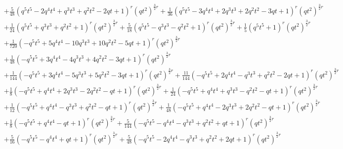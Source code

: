 \documentclass[11pt,english]{amsart}
\numberwithin{equation}{section}
\numberwithin{figure}{section}
\theoremstyle{plain}
\theoremstyle{plain}
\theoremstyle{definition}
\theoremstyle{remark}
\begin{document}
{\begin{align*}
& + \frac{5}{48}  {\left(q^{5} t^{5} - 2  q^{4} t^{4} + q^{3} t^{3} + q^{2} t^{2} - 2  q t + 1\right)}^{r} \left(q t^{2}\right)^{\frac{3}{2}  r} + \frac{1}{36}  {\left(q^{5} t^{5} - 3  q^{4} t^{4} + 2  q^{3} t^{3} + 2  q^{2} t^{2} - 3  q t + 1\right)}^{r} \left(q t^{2}\right)^{\frac{3}{2}  r} \\
& + \frac{1}{24}  {\left(q^{5} t^{5} + q^{3} t^{3} + q^{2} t^{2} + 1\right)}^{r} \left(q t^{2}\right)^{\frac{3}{2}  r} + \frac{5}{18}  {\left(q^{5} t^{5} - q^{3} t^{3} - q^{2} t^{2} + 1\right)}^{r} \left(q t^{2}\right)^{\frac{3}{2}  r} + \frac{1}{5}  {\left(q^{5} t^{5} + 1\right)}^{r} \left(q t^{2}\right)^{\frac{3}{2}  r} \\
& + \frac{1}{720}  {\left(-q^{5} t^{5} + 5  q^{4} t^{4} - 10  q^{3} t^{3} + 10  q^{2} t^{2} - 5  q t + 1\right)}^{r} \left(q t^{2}\right)^{\frac{3}{2}  r} \\
& + \frac{1}{48}  {\left(-q^{5} t^{5} + 3  q^{4} t^{4} - 4  q^{3} t^{3} + 4  q^{2} t^{2} - 3  q t + 1\right)}^{r} \left(q t^{2}\right)^{\frac{3}{2}  r} \\
& + \frac{1}{144}  {\left(-q^{5} t^{5} + 3  q^{4} t^{4} - 5  q^{3} t^{3} + 5  q^{2} t^{2} - 3  q t + 1\right)}^{r} \left(q t^{2}\right)^{\frac{3}{2}  r} + \frac{11}{144}  {\left(-q^{5} t^{5} + 2  q^{4} t^{4} - q^{3} t^{3} + q^{2} t^{2} - 2  q t + 1\right)}^{r} \left(q t^{2}\right)^{\frac{3}{2}  r} \\
& + \frac{1}{8}  {\left(-q^{5} t^{5} + q^{4} t^{4} + 2  q^{3} t^{3} - 2  q^{2} t^{2} - q t + 1\right)}^{r} \left(q t^{2}\right)^{\frac{3}{2}  r} + \frac{1}{24}  {\left(-q^{5} t^{5} + q^{4} t^{4} + q^{3} t^{3} - q^{2} t^{2} - q t + 1\right)}^{r} \left(q t^{2}\right)^{\frac{3}{2}  r} \\
& + \frac{1}{12}  {\left(-q^{5} t^{5} + q^{4} t^{4} - q^{3} t^{3} + q^{2} t^{2} - q t + 1\right)}^{r} \left(q t^{2}\right)^{\frac{3}{2}  r} + \frac{1}{48}  {\left(-q^{5} t^{5} + q^{4} t^{4} - 2  q^{3} t^{3} + 2  q^{2} t^{2} - q t + 1\right)}^{r} \left(q t^{2}\right)^{\frac{3}{2}  r} \\
& + \frac{1}{8}  {\left(-q^{5} t^{5} + q^{4} t^{4} - q t + 1\right)}^{r} \left(q t^{2}\right)^{\frac{3}{2}  r} + \frac{5}{144}  {\left(-q^{5} t^{5} - q^{4} t^{4} - q^{3} t^{3} + q^{2} t^{2} + q t + 1\right)}^{r} \left(q t^{2}\right)^{\frac{3}{2}  r} \\
& + \frac{5}{16}  {\left(-q^{5} t^{5} - q^{4} t^{4} + q t + 1\right)}^{r} \left(q t^{2}\right)^{\frac{3}{2}  r} + \frac{5}{48}  {\left(-q^{5} t^{5} - 2  q^{4} t^{4} - q^{3} t^{3} + q^{2} t^{2} + 2  q t + 1\right)}^{r} \left(q t^{2}\right)^{\frac{3}{2}  r} \\

\end{align*}}
\end{document}
